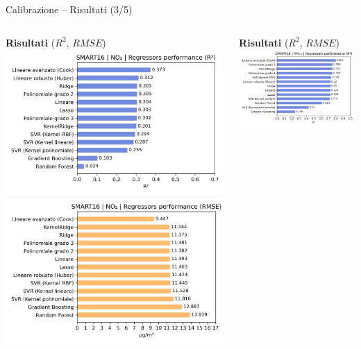 \begin{frame}{Calibrazione – Risultati (3/5)}
\begin{columns}

\begin{column}{0.55\textwidth}
\begin{center}
\textbf{Risultati } ($R^2$, $RMSE$)\vspace{0.2cm}
\includegraphics[width=.8\textwidth]{images/hist_no2_1}
\includegraphics[width=.8\textwidth]{images/hist_no2_2}
\end{center}
\end{column}
\vrule{}
\begin{column}{0.55\textwidth}
\begin{center}
\textbf{Risultati } ($R^2$, $RMSE$)\vspace{0.2cm}
\includegraphics[width=.8\textwidth]{images/hist_pm2.5_1.png}

\end{center}
\end{column}
\end{columns}
\end{frame}
